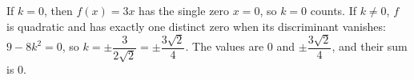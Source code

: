 If $k=0$, then $f(x)=3x$ has the single zero $x=0$, so $k=0$ counts. If $k\ne0$, $f$ is quadratic and has exactly one distinct zero when its discriminant vanishes: $9-8k^2=0$, so $k=\pm\dfrac{3}{2\sqrt2}=\pm\dfrac{3\sqrt2}{4}$. The values are $0$ and $\pm\dfrac{3\sqrt2}{4}$, and their sum is $\boxed{0}$.
